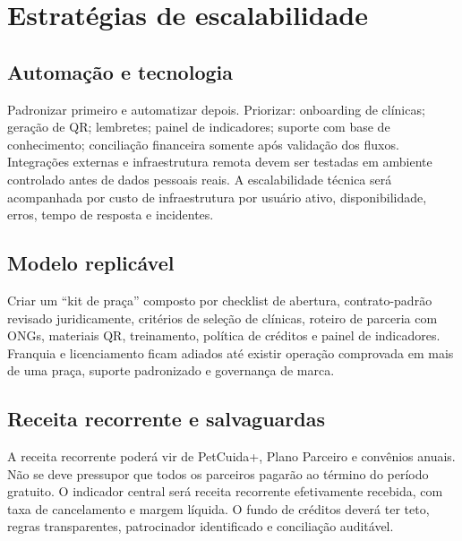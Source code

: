 \section{Estratégias de escalabilidade}
\subsection{Automação e tecnologia}
Padronizar primeiro e automatizar depois. Priorizar: onboarding de clínicas; geração de QR; lembretes; painel de indicadores; suporte com base de conhecimento; conciliação financeira somente após validação dos fluxos. Integrações externas e infraestrutura remota devem ser testadas em ambiente controlado antes de dados pessoais reais. A escalabilidade técnica será acompanhada por custo de infraestrutura por usuário ativo, disponibilidade, erros, tempo de resposta e incidentes.

\subsection{Modelo replicável}
Criar um ``kit de praça'' composto por checklist de abertura, contrato-padrão revisado juridicamente, critérios de seleção de clínicas, roteiro de parceria com ONGs, materiais QR, treinamento, política de créditos e painel de indicadores. Franquia e licenciamento ficam adiados até existir operação comprovada em mais de uma praça, suporte padronizado e governança de marca.

\subsection{Receita recorrente e salvaguardas}
A receita recorrente poderá vir de PetCuida+, Plano Parceiro e convênios anuais. Não se deve pressupor que todos os parceiros pagarão ao término do período gratuito. O indicador central será receita recorrente efetivamente recebida, com taxa de cancelamento e margem líquida. O fundo de créditos deverá ter teto, regras transparentes, patrocinador identificado e conciliação auditável.